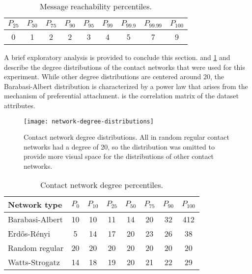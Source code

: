 \begin{table}[tbp]
\centering
\begin{tabular}{SSSSSSSSS}
  \toprule
  {$P_{25}$} & {$P_{50}$} & {$P_{75}$} & {$P_{90}$} & {$P_{95}$} & {$P_{99}$} & {$P_{99.9}$} & {$P_{99.99}$} & {$P_{100}$} \\
   & 1 & 2 & 2 & 3 & 4 & 5 & 7 & 9 \\
  \bottomrule
\end{tabular}
\caption[Message reachability percentiles]{Message reachability percentiles.}
\label{tab:message-reachability}
\end{table}

A brief exploratory analysis is provided to conclude this section.  and \cref{fig:network-degree-distributions} and  describe the degree distributions of the contact networks that were used for this experiment. While other degree distributions are centered around 20, the Barabasi-Albert distribution is characterized by a power law that arises from the mechanism of preferential attachment.  is the correlation matrix of the dataset attributes.

\begin{figure}[tbp]
  \centering
  \texttt{[image: network-degree-distributions]}
  \caption[Contact network degree distributions]{Contact network degree distributions. All \verticesName in random regular contact networks had a degree of 20, so the distribution was omitted to provide more visual space for the distributions of other contact networks.}
  \label{fig:network-degree-distributions}
\end{figure}

\begin{table}[tbp]
\centering
\begin{tabular}{lSSSSSSS}
  \toprule
  Network type & {$P_{0}$} & {$P_{10}$} & {$P_{25}$} & {$P_{50}$} & {$P_{75}$} & {$P_{90}$} & {$P_{100}$} \\
  \midrule
  Barabasi-Albert & 10 & 10 & 11 & 14 & 20 & 32 & 412 \\
  Erd\H{o}s-R\'{e}nyi & 5 & 14 & 17 & 20 & 23 & 26 & 38 \\
  Random regular & 20 & 20 & 20 & 20 & 20 & 20 & 20 \\
  Watts-Strogatz & 14 & 18 & 19 & 20 & 21 & 22 & 29 \\
  \bottomrule
\end{tabular}
\caption[Contact network degree percentiles]{Contact network degree percentiles.}
\label{tab:network-degree-percentiles}
\end{table}

